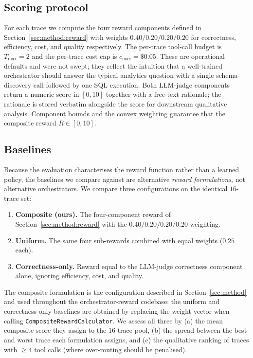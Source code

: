 \documentclass[10pt,twocolumn]{article}
\begin{document}
\subsection{Scoring protocol}
\label{sec:experiments:protocol}
For each trace we compute the four reward components defined in Section~\ref{sec:method:reward} with weights $0.40 / 0.20 / 0.20 / 0.20$ for correctness, efficiency, cost, and quality respectively. The per-trace tool-call budget is $T_{\max} = 2$ and the per-trace cost cap is $c_{\max} = \$0.05$. These are operational defaults and were not swept; they reflect the intuition that a well-trained orchestrator should answer the typical analytics question with a single schema-discovery call followed by one SQL execution. Both LLM-judge components return a numeric score in $[0, 10]$ together with a free-text rationale; the rationale is stored verbatim alongside the score for downstream qualitative analysis. Component bounds and the convex weighting guarantee that the composite reward $R \in [0, 10]$.

\subsection{Baselines}
\label{sec:experiments:baselines}
Because the evaluation characterises the reward function rather than a learned policy, the baselines we compare against are alternative \emph{reward formulations}, not alternative orchestrators. We compare three configurations on the identical $16$-trace set:

\begin{enumerate}
    \item \textbf{Composite (ours).} The four-component reward of Section~\ref{sec:method:reward} with the $0.40 / 0.20 / 0.20 / 0.20$ weighting.
    \item \textbf{Uniform.} The same four sub-rewards combined with equal weights ($0.25$ each).
    \item \textbf{Correctness-only.} Reward equal to the LLM-judge correctness component alone, ignoring efficiency, cost, and quality.
\end{enumerate}

The composite formulation is the configuration described in Section~\ref{sec:method} and used throughout the orchestrator-reward codebase; the uniform and correctness-only baselines are obtained by replacing the weight vector when calling \texttt{CompositeRewardCalculator}. We assess all three by (a) the mean composite score they assign to the $16$-trace pool, (b) the spread between the best and worst trace each formulation assigns, and (c) the qualitative ranking of traces with $\geq 4$ tool calls (where over-routing should be penalised).
\end{document}

